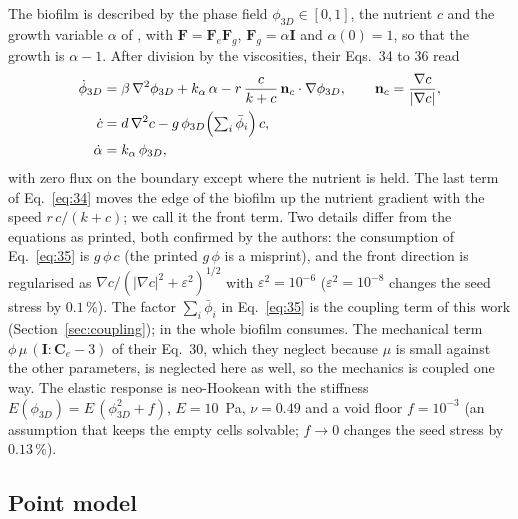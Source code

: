 \documentclass[11pt,a4paper]{article}
\newcommand{\phiD}{\phi_{3D}}
\newcommand{\lv}{\textstyle\sum_i\bar\phi_i}
\newcommand{\nc}{\mathbf n_c}
\begin{document}
The biofilm is described by the phase field $\phiD\in[0,1]$, the nutrient $c$ and the growth variable $\alpha$ of \citet{Klempt2024DiffusionDrivenGrowth}, with $\mathbf F=\mathbf F_e\mathbf F_g$, $\mathbf F_g=\alpha\mathbf I$ and $\alpha(0)=1$, so that the growth is $\alpha-1$. After division by the viscosities, their Eqs.~34 to 36 read
\begin{align}
\dot\phiD &= \beta\,\nabla^2\phiD + k_\alpha\,\alpha - r\,\frac{c}{k+c}\,\nc\cdot\nabla\phiD, \qquad \nc=\frac{\nabla c}{|\nabla c|}, \label{eq:34}\\
\dot c &= d\,\nabla^2 c - g\,\phiD\Bigl(\lv\Bigr)\,c, \label{eq:35}\\
\dot\alpha &= k_\alpha\,\phiD, \label{eq:36}
\end{align}
with zero flux on the boundary except where the nutrient is held. The last term of Eq.~\eqref{eq:34} moves the edge of the biofilm up the nutrient gradient with the speed $r\,c/(k+c)$; we call it the front term. Two details differ from the equations as printed, both confirmed by the authors: the consumption of Eq.~\eqref{eq:35} is $g\,\phi\,c$ (the printed $g\,\phi$ is a misprint), and the front direction is regularised as $\nabla c/(|\nabla c|^2+\varepsilon^2)^{1/2}$ with $\varepsilon^2=10^{-6}$ ($\varepsilon^2=10^{-8}$ changes the seed stress by $0.1\,\%$). The factor $\lv$ in Eq.~\eqref{eq:35} is the coupling term of this work (Section~\ref{sec:coupling}); in \citet{Klempt2024DiffusionDrivenGrowth} the whole biofilm consumes. The mechanical term $\phi\,\mu\,(\mathbf I:\mathbf C_e-3)$ of their Eq.~30, which they neglect because $\mu$ is small against the other parameters, is neglected here as well, so the mechanics is coupled one way. The elastic response is neo-Hookean with the stiffness $E(\phiD)=E\,(\phiD^2+f)$, $E=10$~Pa, $\nu=0.49$ and a void floor $f=10^{-3}$ (an assumption that keeps the empty cells solvable; $f\to0$ changes the seed stress by $0.13\,\%$).

\subsection{Point model}
\label{sec:point}
\end{document}
